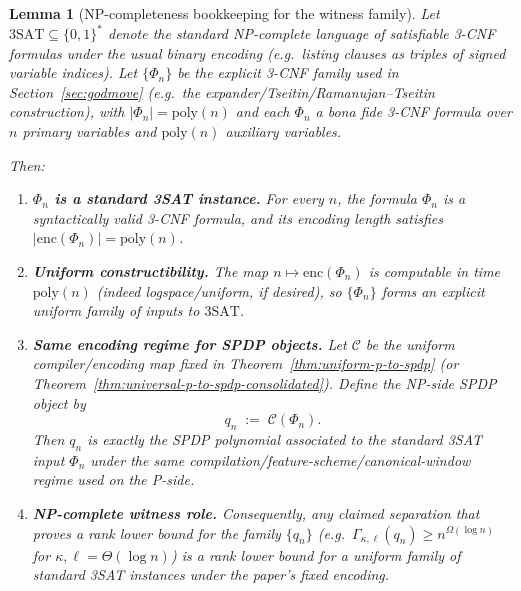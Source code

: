 \documentclass[12pt]{article}
\newcommand{\poly}{\mathrm{poly}}
\newcommand{\Comp}{\mathcal{C}}
\newcommand{\enc}{\mathrm{enc}}
\newtheorem{lemma}[theorem]{Lemma}
\theoremstyle{definition}
\theoremstyle{definition}
\theoremstyle{remark}
\theoremstyle{remark}
\begin{document}
\begin{lemma}[NP-completeness bookkeeping for the witness family]
\label{lem:np-complete-witness-bookkeeping}
Let $\mathrm{3SAT}\subseteq\{0,1\}^\ast$ denote the standard NP-complete
language of satisfiable 3-CNF formulas under the usual binary encoding
(e.g.\ listing clauses as triples of signed variable indices). Let
$\{\Phi_n\}$ be the explicit 3-CNF family used in
Section~\ref{sec:godmove} (e.g.\ the expander/Tseitin/Ramanujan--Tseitin
construction), with $|\Phi_n|=\poly(n)$ and each $\Phi_n$ a bona fide 3-CNF
formula over $n$ primary variables and $\poly(n)$ auxiliary variables.

Then:

\begin{enumerate}[label=(\roman*)]
\item \textbf{$\Phi_n$ is a standard 3SAT instance.}
For every $n$, the formula $\Phi_n$ is a syntactically valid 3-CNF formula,
and its encoding length satisfies $|\enc(\Phi_n)|=\poly(n)$.

\item \textbf{Uniform constructibility.}
The map $n\mapsto \enc(\Phi_n)$ is computable in time $\poly(n)$ (indeed
logspace/uniform, if desired), so $\{\Phi_n\}$ forms an explicit uniform family
of inputs to $\mathrm{3SAT}$.

\item \textbf{Same encoding regime for SPDP objects.}
Let $\Comp$ be the uniform compiler/encoding map fixed in
Theorem~\ref{thm:uniform-p-to-spdp} (or Theorem~\ref{thm:universal-p-to-spdp-consolidated}).
Define the NP-side SPDP object by
\[
q_n \;:=\; \Comp(\Phi_n).
\]
Then $q_n$ is exactly the SPDP polynomial associated to the standard 3SAT input
$\Phi_n$ under the \emph{same} compilation/feature-scheme/canonical-window
regime used on the P-side.

\item \textbf{NP-complete witness role.}
Consequently, any claimed separation that proves a rank lower bound for the
family $\{q_n\}$ (e.g.\ $\Gamma_{\kappa,\ell}(q_n)\ge n^{\Omega(\log n)}$ for
$\kappa,\ell=\Theta(\log n)$) is a rank lower bound for a uniform family of
\emph{standard 3SAT instances} under the paper's fixed encoding.
\end{enumerate}
\end{lemma}
\end{document}
